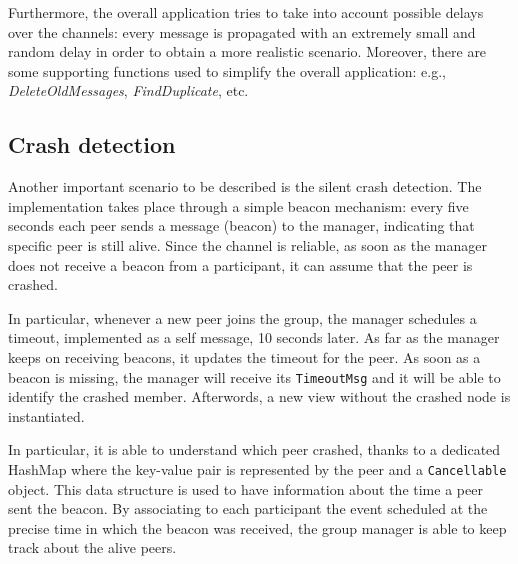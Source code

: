 \documentclass[conference]{IEEEtran}
\begin{document}
Furthermore, the overall application tries to take into account possible delays over the channels: every message is propagated with an extremely small and random delay in order to obtain a more realistic scenario. Moreover, there are some supporting functions used to simplify the overall application: e.g., \textit{DeleteOldMessages}, \textit{FindDuplicate}, etc.

\subsection{Crash detection}
Another important scenario to be described is the silent crash detection. The implementation takes place through a simple beacon mechanism: every five seconds each peer sends a message (beacon) to the manager, indicating that specific peer is still alive. Since the channel is reliable, as soon as the manager does not receive a beacon from a participant, it can assume that the peer is crashed.

In particular, whenever a new peer joins the group, the manager schedules a timeout, implemented as a self message, 10 seconds later.  As far as the manager keeps on receiving beacons, it updates the timeout for the peer. As soon as a beacon is missing, the manager will receive its \texttt{TimeoutMsg} and it will be able to identify the crashed member. Afterwords, a new view without the crashed node is instantiated.

In particular, it is able to understand which peer crashed, thanks to a dedicated HashMap where the key-value pair is represented by the peer and a \texttt{Cancellable} object. This data structure is used to have information about the time a peer sent the beacon. By associating to each participant the event scheduled at the precise time in which the beacon was received, the group manager is able to keep track about the alive peers.

\end{document}
